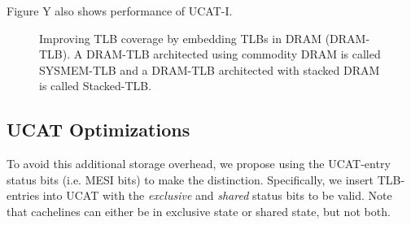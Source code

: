 Figure Y also shows performance of UCAT-I.

\begin{figure*}[t] 
  \vspace{-0. in} \centering
   \centerline{}

  \caption{\small Improving TLB coverage by embedding TLBs in DRAM
    (DRAM-TLB). A DRAM-TLB architected using commodity DRAM is called
    SYSMEM-TLB and a DRAM-TLB architected with stacked DRAM is called
    Stacked-TLB. \normalsize}
  \label{fig:stacked_tlb} 
  \vspace{-0. in}
\end{figure*}

\subsection{UCAT Optimizations}

To avoid this additional storage overhead, we propose using the
UCAT-entry status bits (i.e. MESI bits) to make the distinction.
Specifically, we insert TLB-entries into UCAT with the {\em exclusive}
and {\em shared} status bits to be valid. Note that cachelines can
either be in exclusive state or shared state, but not both.

